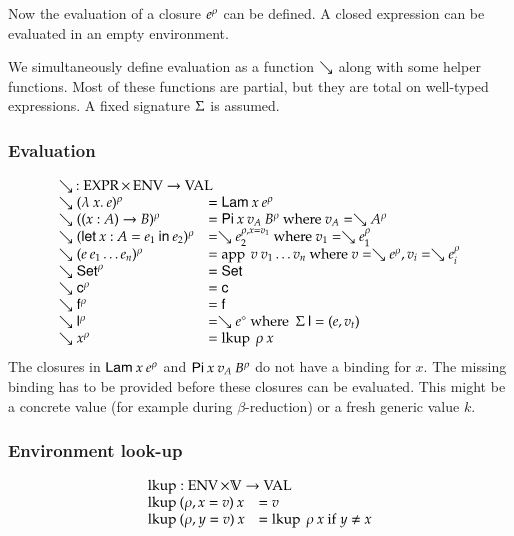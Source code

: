Now the evaluation of a closure $e^{\rho}$ can be defined. 
A closed expression can be evaluated in an empty environment.

We simultaneously define evaluation as a function $\searrow$ along with some helper functions.    
Most of these functions are partial, but they are total on well-typed expressions.
A fixed signature $\Sigma$ is assumed.

\subsubsection{Evaluation}

\[
\begin{array}{ll}
\multicolumn{2}{l}{\wh \: : \Expr \times \Env \ra \Val}\\
\wh \clp{\lam{x}{e}}{\rho} & = \vlam \: x \: \cl{e}{\rho} \\
\wh \clp{\EPi{x}{A}{B}}{\rho} &= \vpi \: x \: v_A \: \cl{B}{\rho} \mbox{ where } v_A = \wh \cl{A}{\rho} \\
\wh \clp{\ELet{x}{A}{e_1}{e_2}}{\rho} &= \wh \cl{e_2}{\ins{\rho}{x}{v_1}} \mbox { where } v_1 = \wh \cl{e_1}{\rho} \\
\wh \clp{e \: e_1 \ldots e_n}{\rho} &= \ap \: v \: v_1 \ldots v_n \mbox{ where } v = \wh \cl{e}{\rho} , v_i = \wh \cl{e_i}{\rho}\\
\wh \cl{\Set}{\rho} & = \Set \\ 
\wh \cl{\cc}{\rho} & = \cc  \\
\wh \cl{\ff}{\rho} & = \ff \\
\wh \cl{\dd}{\rho} & = \wh \cl{e}{\diamond} \mbox{ where } \: \Sig \: \dd = (e,v_t)\\
\wh \cl{x}{\rho} & = \lkup \: \rho \: x \\
\end{array}
\]
The closures in $\mathsf{Lam} \: x \: e^{\rho}$
and $\mathsf{Pi} \: x \: v_A \: B^{\rho}$ do not have a binding for $x$.
The missing binding has to be provided before these closures can be evaluated.
This might be a concrete value (for example during $\beta$-reduction) or a
fresh generic value $k$.

\subsubsection{Environment look-up}
\[
\begin{array}{ll}
\multicolumn{2}{l}{\lkup : \Env \times \cV \ra \Val }\\
\lkup \: (\ins{\rho}{x}{v}) \: x & = v \\
\lkup \: (\ins{\rho}{y}{v}) \: x & = \lkup \: \rho \: x \mbox{ if } y \neq x  
\end{array}
\]

